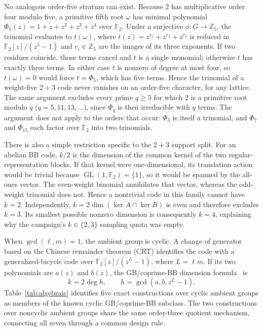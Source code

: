 \documentclass[aps,prx,twocolumn,superscriptaddress,nofootinbib,floatfix]{revtex4-2}
\newcommand{\FF}{\ensuremath{\mathbb{F}}}
\begin{document}
No analogous order-five stratum can exist.  Because $2$ has multiplicative
order four modulo five, a primitive fifth root $\omega$ has minimal polynomial
$\Phi_5(z)=1+z+z^2+z^3+z^4$ over $\FF_2$.  Under a surjective
$\phi:G\to\mathbb Z_5$, the trinomial evaluates to $t(\omega)$, where
$t(z)=z^{r_1}+z^{r_2}+z^{r_3}$ is reduced in $\FF_2[z]/(z^5-1)$ and
$r_i\in\mathbb Z_5$ are the images of its three exponents.  If two residues
coincide, those terms cancel and $t$ is a single monomial; otherwise $t$ has
exactly three terms.  In either case $t$ is nonzero of degree at most four, so
$t(\omega)=0$ would force $t=\Phi_5$, which has five terms.  Hence the trinomial
of a weight-five $2+3$ code never vanishes on an order-five character, for any
lattice.  The same argument excludes every prime $q\geq5$ for which $2$ is a
primitive root modulo $q$ ($q=5,11,13,\ldots$), since $\Phi_q$ is then
irreducible with $q$ terms.  The argument does not apply to the orders that
occur: $\Phi_3$ is itself a trinomial, and $\Phi_7$ and $\Phi_{15}$ each
factor over $\FF_2$ into two trinomials.

There is also a simple restriction specific to the $2+3$ support split.  For
an abelian BB code, $k/2$ is the dimension of the common kernel of the two
regular-representation blocks.  If that kernel were one-dimensional, its
translation action would be trivial because
$\operatorname{GL}(1,\FF_2)=\{1\}$, so it would be spanned by the all-ones
vector.  The even-weight binomial annihilates that vector, whereas the
odd-weight trinomial does not.  Hence a nontrivial code in this family cannot
have $k=2$.  Independently, $k=2\dim(\ker A\cap\ker B)$ is even and therefore
excludes $k=3$.  Its smallest possible nonzero dimension is consequently
$k=4$, explaining why the campaign's $k\in\{2,3\}$ sampling quota was empty.

When $\gcd(\ell,m)=1$, the ambient group is cyclic.  A change of generator
based on the Chinese remainder theorem (CRT) identifies the code with a
generalized-bicycle code over $\FF_2[z]/(z^{L}-1)$, where $L=\ell m$.  If its
two polynomials are $a(z)$ and $b(z)$, the GB/coprime-BB dimension
formula~\cite{panteleev2021degenerate,wang2024coprime} is
\begin{equation}
 k=2\deg h,\qquad h=\gcd(a,b,z^L-1).
 \label{eq:cyclic-kernel-dimension}
\end{equation}
Table~\ref{tab:algebraic} identifies five exact constructions over cyclic
ambient groups as members of the known cyclic GB/coprime-BB subclass.  The two
constructions over noncyclic ambient groups share the same order-three quotient
mechanism, connecting all seven through a common design rule.
\end{document}
